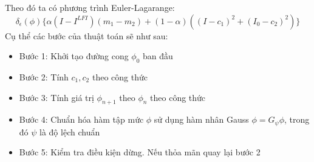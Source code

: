 \documentclass[12pt,oneside,a4]{report}
\begin{document}
Theo đó ta có phương trình Euler-Lagarange:
\begin{equation}
\delta_{\epsilon}(\phi)\{\alpha(I-I^{LFI})(m_1-m_2)+(1-\alpha)((I-c_1)^2+ (I_0-c_2)^2)\}
\end{equation}
Cụ thể các bước của thuật toán sẽ như sau:
\begin{itemize}
\item Bước 1: Khởi tạo đường cong $\phi_0$ ban đầu
\item Bước 2: Tính $c_1, c_2$ theo công thức 
\item Bước 3: Tính giá trị $\phi_{n+1}$ theo $\phi_{n}$ theo công thức 
\item Bước 4: Chuẩn hóa hàm tập mức $\phi$ sử dụng hàm nhân Gauss $\phi=G_{\psi}\phi$, trong đó $\psi$ là độ lệch chuẩn
\item Bước 5: Kiểm tra điều kiện dừng. Nếu thỏa mãn quay lại bước 2
\end{itemize}
\end{document}
